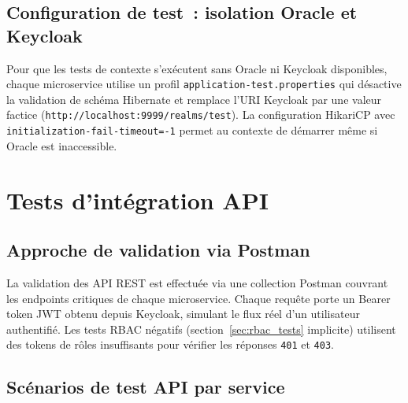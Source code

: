 \subsection{Configuration de test~: isolation Oracle et Keycloak}

Pour que les tests de contexte s'exécutent sans Oracle ni Keycloak disponibles,
chaque microservice utilise un profil \texttt{application-test.properties} qui
désactive la validation de schéma Hibernate et remplace l'URI Keycloak par une
valeur factice (\texttt{http://localhost:9999/realms/test}). La configuration
HikariCP avec \texttt{initialization-fail-timeout=-1} permet au contexte de
démarrer même si Oracle est inaccessible.

\section{Tests d'intégration API}

\subsection{Approche de validation via Postman}

La validation des API REST est effectuée via une collection Postman couvrant les
endpoints critiques de chaque microservice. Chaque requête porte un Bearer token JWT
obtenu depuis Keycloak, simulant le flux réel d'un utilisateur authentifié. Les
tests RBAC négatifs (section~\ref{sec:rbac_tests} implicite) utilisent des tokens
de rôles insuffisants pour vérifier les réponses \texttt{401} et \texttt{403}.

\subsection{Scénarios de test API par service}


